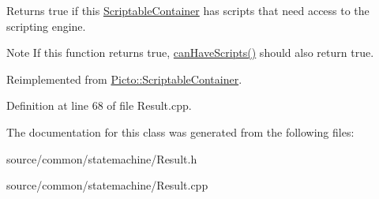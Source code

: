 Returns true if this \hyperlink{class_picto_1_1_scriptable_container}{Scriptable\-Container} has scripts that need access to the scripting engine. 

\begin{DoxyNote}{Note}
If this function returns true, \hyperlink{class_picto_1_1_result_a02d6b44ae59830de082b750882cb7c46}{can\-Have\-Scripts()} should also return true. 
\end{DoxyNote}


Reimplemented from \hyperlink{class_picto_1_1_scriptable_container_acb933156df40af1820e623fa92d051a4}{Picto\-::\-Scriptable\-Container}.



Definition at line 68 of file Result.\-cpp.



The documentation for this class was generated from the following files\-:\begin{DoxyCompactItemize}
\item 
source/common/statemachine/Result.\-h\item 
source/common/statemachine/Result.\-cpp\end{DoxyCompactItemize}
